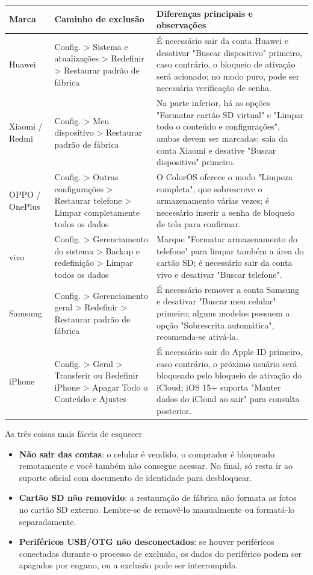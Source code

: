 \begin{center}
\begin{tabularx}{\linewidth}{|X|X|X|}
\hline
\textbf{Marca} & \textbf{Caminho de exclusão} & \textbf{Diferenças principais e observações} \tabularnewline
\hline
Huawei & Config. > Sistema e atualizações > Redefinir > Restaurar padrão de fábrica & É necessário sair da conta Huawei e desativar "Buscar dispositivo" primeiro, caso contrário, o bloqueio de ativação será acionado; no modo puro, pode ser necessária verificação de senha. \tabularnewline
Xiaomi / Redmi & Config. > Meu dispositivo > Restaurar padrão de fábrica & Na parte inferior, há as opções "Formatar cartão SD virtual" e "Limpar todo o conteúdo e configurações", ambas devem ser marcadas; saia da conta Xiaomi e desative "Buscar dispositivo" primeiro. \tabularnewline
OPPO / OnePlus & Config. > Outras configurações > Restaurar telefone > Limpar completamente todos os dados & O ColorOS oferece o modo "Limpeza completa", que sobrescreve o armazenamento várias vezes; é necessário inserir a senha de bloqueio de tela para confirmar. \tabularnewline
vivo & Config. > Gerenciamento do sistema > Backup e redefinição > Limpar todos os dados & Marque "Formatar armazenamento do telefone" para limpar também a área do cartão SD; é necessário sair da conta vivo e desativar "Buscar telefone". \tabularnewline
Samsung & Config. > Gerenciamento geral > Redefinir > Restaurar padrão de fábrica & É necessário remover a conta Samsung e desativar "Buscar meu celular" primeiro; alguns modelos possuem a opção "Sobrescrita automática", recomenda-se ativá-la. \tabularnewline
iPhone & Config. > Geral > Transferir ou Redefinir iPhone > Apagar Todo o Conteúdo e Ajustes & É necessário sair do Apple ID primeiro, caso contrário, o próximo usuário será bloqueado pelo bloqueio de ativação do iCloud; iOS 15+ suporta "Manter dados do iCloud ao sair" para consulta posterior. \tabularnewline
\hline
\end{tabularx}
\end{center}

\begin{tcbwarn}{As três coisas mais fáceis de esquecer}
\begin{itemize}
  \item \textbf{Não sair das contas}: o celular é vendido, o comprador é bloqueado remotamente e você também não consegue acessar. No final, só resta ir ao suporte oficial com documento de identidade para desbloquear.
  \item \textbf{Cartão SD não removido}: a restauração de fábrica não formata as fotos no cartão SD externo. Lembre-se de removê-lo manualmente ou formatá-lo separadamente.
  \item \textbf{Periféricos USB/OTG não desconectados}: se houver periféricos conectados durante o processo de exclusão, os dados do periférico podem ser apagados por engano, ou a exclusão pode ser interrompida.
\end{itemize}

\end{tcbwarn}

